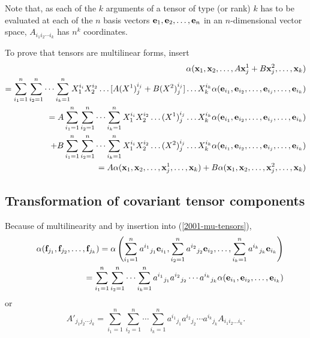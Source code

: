 Note that, as each of the $k$ arguments of  a tensor of type (or rank) $k$ has to be evaluated
at each of the $n$ basis vectors ${\bf e}_1,{\bf e}_2,\ldots ,{\bf e}_n$ in an $n$-dimensional vector space,
$A_{{i_1}{i_2}\cdots {i_k}} $ has $n^k$  coordinates.

{\color{OliveGreen}
\bproof
To prove that tensors are multilinear forms, insert
\begin{equation}
\begin{split}
 \alpha ( {\bf x}_1,{\bf x}_2,\ldots , A{\bf x}^1_j+B{\bf x}_j^2,\ldots ,{\bf x}_k)
\\
=
\sum_{i_1=1}^n
\sum_{i_2=1}^n
\cdots
\sum_{i_k=1}^n
X^{i_i}_1X^{i_2}_2\ldots  [A(X^1)^{i_j}_j+B(X^2)^{i_j}_j]\ldots X^{i_k}_k
\alpha ( {\bf e}_{i_1},{\bf e}_{i_2},\ldots,{\bf e}_{i_j},\ldots ,{\bf e}_{i_k})
\\
= A
\sum_{i_1=1}^n
\sum_{i_2=1}^n
\cdots
\sum_{i_k=1}^n
X^{i_i}_1X^{i_2}_2\ldots  (X^1)^{i_j}_j\ldots X^{i_k}_k
\alpha ( {\bf e}_{i_1},{\bf e}_{i_2},\ldots,{\bf e}_{i_j},\ldots ,{\bf e}_{i_k})
\\
\quad +
B
\sum_{i_1=1}^n
\sum_{i_2=1}^n
\cdots
\sum_{i_k=1}^n
X^{i_i}_1X^{i_2}_2\ldots  (X^2)^{i_j}_j\ldots X^{i_k}_k
\alpha ( {\bf e}_{i_1},{\bf e}_{i_2},\ldots,{\bf e}_{i_j},\ldots ,{\bf e}_{i_k})
\\
=
A \alpha ( {\bf x}_1,{\bf x}_2,\ldots , {\bf x}^1_j,\ldots ,{\bf x}_k)+
B \alpha ( {\bf x}_1,{\bf x}_2,\ldots , {\bf x}_j^2,\ldots ,{\bf x}_k)\nonumber
\end{split}
\end{equation}
\eproof
}

\subsection{Transformation of covariant tensor components}

Because of multilinearity  and by insertion into
(\ref{2001-mu-tensors}),
\begin{eqnarray}
&&\alpha ( {\bf f}_{j_1},{\bf f}_{j_2},\ldots ,{\bf f}_{j_k})=
\alpha \left(
\sum_{i_1=1}^n {a^{i_1}}_{j_1} {\bf e}_{i_1},
\sum_{i_2=1}^n {a^{i_2}}_{j_2} {\bf e}_{i_2},
\ldots ,
\sum_{i_k=1}^n {a^{i_k}}_{j_k} {\bf e}_{i_k}
\right)
\nonumber \\&& \quad
=
\sum_{i_1=1}^n\sum_{i_2=1}^n\cdots \sum_{i_k=1}^n
{a^{i_1}}_{j_1}{a^{i_2}}_{j_2}\cdots {a^{i_k}}_{j_k} \alpha ( {\bf e}_{i_1},{\bf e}_{i_2},\ldots ,{\bf e}_{i_k})
\label{2012-m-ch-tensor-etotc1}
\end{eqnarray}
or
\begin{equation}
A'_{{j_1}{j_2}\cdots {j_k}}=
\sum_{i_1=1}^n\sum_{i_2=1}^n\cdots \sum_{i_k=1}^n
{a^{i_1}}_{j_1}{a^{i_2}}_{j_2}\cdots {a^{i_k}}_{j_k} A_{i_1 i_2\ldots i_k}.
\label{2011-m-tvtcov}
\end{equation}



